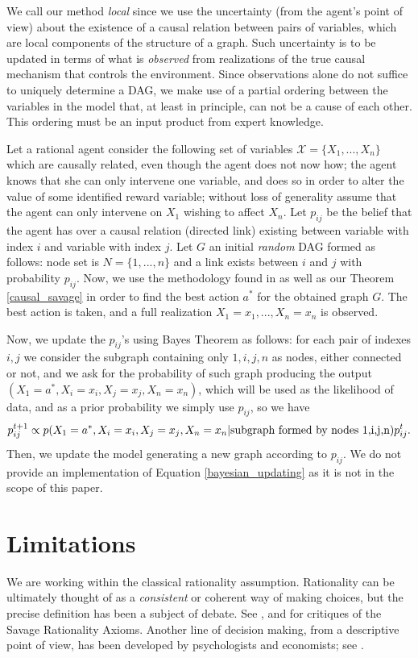 \documentclass{svjour3}                     %
\begin{document}
We call our method \textit{local} since we use the uncertainty (from the agent's point of view) about the existence of a causal relation between pairs of variables, which are local components of the structure of a graph. Such uncertainty is to be updated in terms of what is \textit{observed} from realizations of the true causal mechanism that controls the environment. Since observations alone do not suffice to uniquely determine a DAG, we make use of a partial ordering between the variables in the model that, at least in principle, can not be a cause of each other. This ordering must be an input product from expert knowledge.

Let a rational agent consider the following set of variables $\mathcal{X}=\{ X_1,...,X_n \}$ which are causally related, even though the agent does not now how; the agent knows that she can only intervene one variable, and does so in order to alter the value of some  identified reward variable; without loss of generality assume that the agent can only intervene on $X_1$ wishing to affect $X_n$. Let $p_{ij}$ be the belief that the agent has over a causal relation (directed link) existing between variable with index $i$ and variable with index $j$. Let $G$ an initial {\em random} DAG formed as follows: node set is $N=\{1,...,n\}$ and a link exists between $i$ and $j$ with probability $p_{ij}$. Now, we use the methodology found in \cite{gonzalez2018playing}  as well as our Theorem \ref{causal_savage} in order to find the best action $a^\ast$ for the obtained graph $G$. The best action is taken, and a full realization $X_1=x_1,...,X_n=x_n$ is observed.

Now, we update the $p_{ij}$'s using Bayes Theorem as follows: for each pair of indexes $i,j$ we consider the subgraph containing only $1,i,j,n$ as nodes, either connected or not, and we ask for the probability of such graph producing the output $(X_1 = a^\ast, X_i = x_i, X_j=x_j, X_n=x_n)$, which will be used as the likelihood of data, and as a prior probability we simply use $p_{ij}$, so we have
\begin{equation}{\label{bayesian_updating}}
p_{ij}^{t+1} \propto p(X_1 = a^\ast, X_i = x_i, X_j=x_j, X_n=x_n | \textrm{subgraph formed by nodes 1,i,j,n})p_{ij}^t.
\end{equation}
Then, we update the model generating a new graph according to $p_{ij}$. We do not provide an implementation of Equation \ref{bayesian_updating} as it is not in the scope of this paper.

\section{Limitations}
\label{limitations}
We are working within the classical rationality assumption. Rationality can be ultimately thought of as a \textit{consistent} or coherent way of making choices, but the precise definition has been a subject of debate. See \cite{ellsberg1961risk}, \cite{gilboa2009decision} and \cite{machina2014ambiguity} for critiques of the Savage Rationality Axioms. Another line of decision making, from a descriptive point of view, has been developed by psychologists and economists; see \cite{TverskyKahneman74,kahneman1979prospect,kahneman2000choices}.
\end{document}
